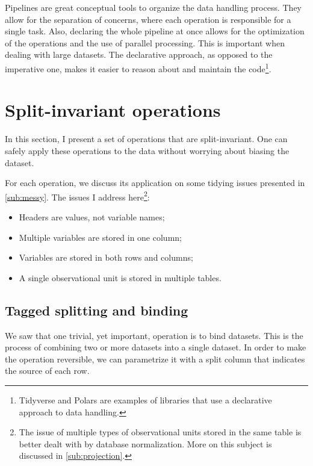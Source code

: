 Pipelines are great conceptual tools to organize the data handling process.  They allow
for the separation of concerns, where each operation is responsible for a single task.
Also, declaring the whole pipeline at once allows for the optimization of the operations
and the use of parallel processing.  This is important when dealing with large datasets.
The declarative approach, as opposed to the imperative one, makes it easier to reason about
and maintain the code\footnote{Tidyverse and Polars are examples of
libraries that use a declarative approach to data handling.}.

\section{Split-invariant operations}
\label{sec:split-invariant-ops}

In this section, I present a set of operations that are split-invariant.  One can safely
apply these operations to the data without worrying about biasing the dataset.

For each operation, we discuss its application on some tidying issues presented in
\cref{sub:messy}.  The issues I address here\footnote{%
The issue of multiple types of observational units stored in the same table is better
dealt with by database normalization.  More on this subject is discussed in
\cref{sub:projection}.}:
\begin{itemize}
  \itemsep0em
  \item Headers are values, not variable names;
  \item Multiple variables are stored in one column; %
  \item Variables are stored in both rows and columns;
  \item A single observational unit is stored in multiple tables.
\end{itemize}



\subsection{Tagged splitting and binding}

We saw that one trivial, yet important, operation is to bind datasets.  This is the
process of combining two or more datasets into a single dataset.  In order to make the
operation reversible, we can parametrize it with a split column that indicates the source
of each row.

